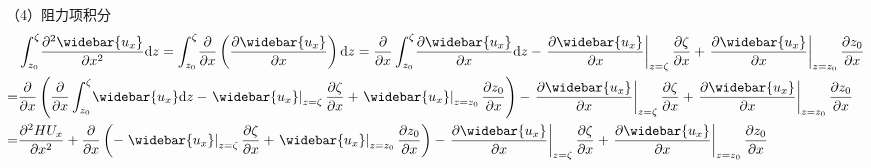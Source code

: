 （4）阻力项积分
\begin{equation}
  \begin{aligned}
    &\int_{z_{0}}^{\zeta}\!
    \frac{\partial^{2} \widebar{u_{x}}}{\partial x^{2}}
    \mathrm{d}z
    =
    \int_{z_{0}}^{\zeta}\!
    \frac{\partial}{\partial x}
    \left(\frac{\partial \widebar{u_{x}}}{\partial x}\right)
    \mathrm{d}z
    =
    \frac{\partial}{\partial x}
    \int_{z_0}^{\zeta}\!
    \frac{\partial \widebar{u_{x}}}{\partial x}
    \mathrm{d}z
    -
    \left.\frac{\partial \widebar{u_{x}}}{\partial x}\right|_{z=\zeta}\frac{\partial \zeta}{\partial x}
    +
    \left.\frac{\partial \widebar{u_{x}}}{\partial x}\right|_{z=z_{0}}\frac{\partial z_{0}}{\partial x}
    \\
    =&
    \frac{\partial}{\partial x}
    \left(
    \frac{\partial}{\partial x}
    \int_{z_0}^{\zeta}\!
    \widebar{u_{x}}
    \mathrm{d}z
    -
    \left.\widebar{u_{x}}\right|_{z=\zeta}\frac{\partial \zeta}{\partial x}
    +
    \left.\widebar{u_{x}}\right|_{z=z_{0}}\frac{\partial z_{0}}{\partial x}
    \right)
    -
    \left.\frac{\partial \widebar{u_{x}}}{\partial x}\right|_{z=\zeta}\frac{\partial \zeta}{\partial x}
    +
    \left.\frac{\partial \widebar{u_{x}}}{\partial x}\right|_{z=z_{0}}\frac{\partial z_{0}}{\partial x}
      \\
    =&
    \frac{\partial^{2} HU_{x}}{\partial x^{2}} +
    \frac{\partial}{\partial x}
    \left(
    -
    \left.\widebar{u_{x}}\right|_{z=\zeta}\frac{\partial \zeta}{\partial x}
    +
    \left.\widebar{u_{x}}\right|_{z=z_{0}}\frac{\partial z_{0}}{\partial x}
    \right)
    -
    \left.\frac{\partial \widebar{u_{x}}}{\partial x}\right|_{z=\zeta}\frac{\partial \zeta}{\partial x}
    +
    \left.\frac{\partial \widebar{u_{x}}}{\partial x}\right|_{z=z_{0}}\frac{\partial z_{0}}{\partial x}
  \end{aligned}
  \label{EqCGe_Shear_1}
\end{equation}

